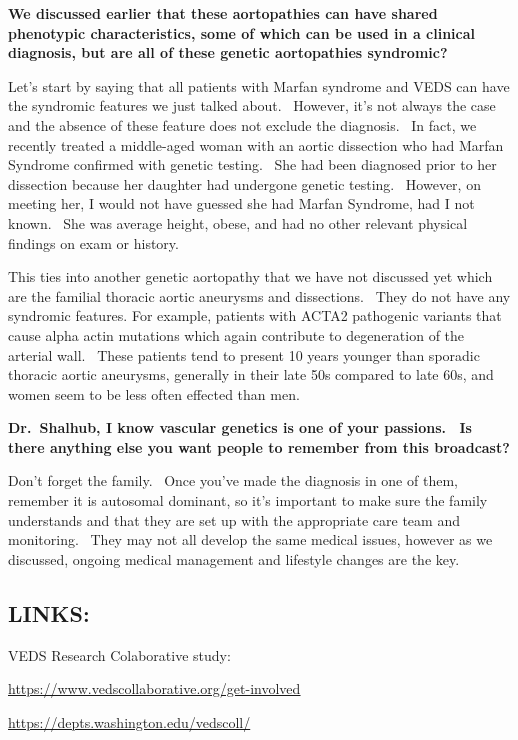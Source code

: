 \documentclass[
]{book}
\begin{document}
\textbf{We discussed earlier that these aortopathies can have shared
phenotypic characteristics, some of which can be used in a clinical
diagnosis, but are all of these genetic aortopathies syndromic?}

Let's start by saying that all patients with Marfan syndrome and VEDS
can have the syndromic features we just talked about. ~However, it's not
always the case and the absence of these feature does not exclude the
diagnosis.~ In fact, we recently treated a middle-aged woman with an
aortic dissection who had Marfan Syndrome confirmed with genetic
testing.~ She had been diagnosed prior to her dissection because her
daughter had undergone genetic testing.~ However, on meeting her, I
would not have guessed she had Marfan Syndrome, had I not known.~ She
was average height, obese, and had no other relevant physical findings
on exam or history.~

This ties into another genetic aortopathy that we have not discussed yet
which are the familial thoracic aortic aneurysms and dissections.~ They
do not have any syndromic features. For example, patients with ACTA2
pathogenic variants that cause alpha actin mutations which again
contribute to degeneration of the arterial wall.~ These patients tend to
present 10 years younger than sporadic thoracic aortic aneurysms,
generally in their late 50s compared to late 60s, and women seem to be
less often effected than men.~

\textbf{Dr.~Shalhub, I know vascular genetics is one of your passions.~ Is
there anything else you want people to remember from this broadcast?}

Don't forget the family.~ Once you've made the diagnosis in one of them,
remember it is autosomal dominant, so it's important to make sure the
family understands and that they are set up with the appropriate care
team and monitoring.~ They may not all develop the same medical issues,
however as we discussed, ongoing medical management and lifestyle
changes are the key.

\hypertarget{links}{%
\subsection{LINKS:}\label{links}}

VEDS Research Colaborative study:~

\href{https://www.vedscollaborative.org/get-involved}{\underline{https://www.vedscollaborative.org/get-involved}}

\url{https://depts.washington.edu/vedscoll/}
\end{document}
